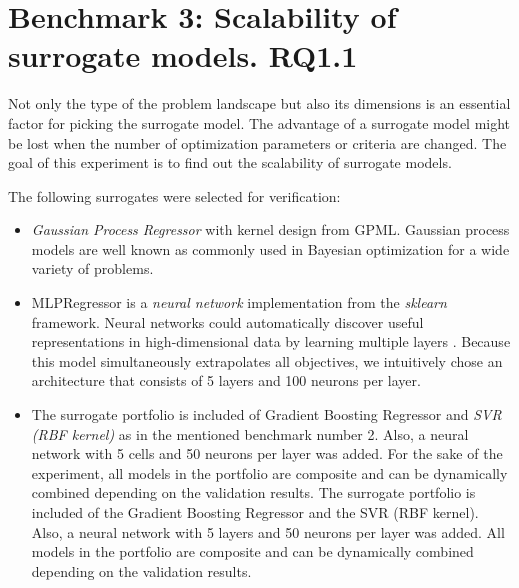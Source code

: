 \section{Benchmark 3: Scalability of surrogate models. RQ1.1}
    Not only the type of the problem landscape but also its dimensions is an essential factor for picking the surrogate model. The advantage of a surrogate model might be lost when the number of optimization parameters or criteria are changed. The goal of this experiment is to find out the scalability of surrogate models. 


    The following surrogates were selected for verification:
    \begin{itemize}
        \item \emph{Gaussian Process Regressor} with kernel design from GPML\cite{RasmussenN10}. Gaussian process models are well known as commonly used in Bayesian optimization for a wide variety of problems. 
        \item MLPRegressor is a \emph{neural network} implementation from the \textit{sklearn} framework. Neural networks could automatically discover useful representations in high-dimensional data by learning multiple layers \cite{WilsonHSX16}. Because this model simultaneously extrapolates all objectives, we intuitively chose an architecture that consists of 5 layers and 100 neurons per layer.
        \item The surrogate portfolio is included of Gradient Boosting Regressor and \emph{SVR (RBF kernel)} as in the mentioned benchmark number 2. Also, a neural network with 5 cells and 50 neurons per layer was added. For the sake of the experiment, all models in the portfolio are composite and can be dynamically combined depending on the validation results. The surrogate portfolio is included of the Gradient Boosting Regressor and the SVR (RBF kernel). Also, a neural network with 5 layers and 50 neurons per layer was added. All models in the portfolio are composite and can be dynamically combined depending on the validation results.
    \end{itemize}


